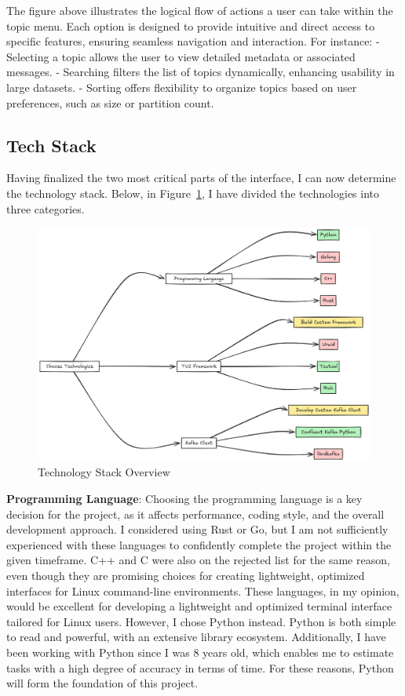 \documentclass[10pt , a4paper]{report}
\begin{document}
The figure above illustrates the logical flow of actions a user can take within the topic menu. Each option is designed to provide intuitive and direct access to specific features, ensuring seamless navigation and interaction. For instance:
- Selecting a topic allows the user to view detailed metadata or associated messages.
- Searching filters the list of topics dynamically, enhancing usability in large datasets.
- Sorting offers flexibility to organize topics based on user preferences, such as size or partition count.


\newpage
\subsection{Tech Stack}

Having finalized the two most critical parts of the interface, I can now determine the technology stack. Below, in Figure~\ref{fig:tech_chart}, I have divided the technologies into three categories.

\begin{figure}[htbp]
    \centering
    \includegraphics[width=.8\linewidth]{imgs/TechDiagram.png}
    \caption{Technology Stack Overview}
    \label{fig:tech_chart}
\end{figure}

\textbf{Programming Language}: Choosing the programming language is a key decision for the project, as it affects performance, coding style, and the overall development approach. I considered using Rust or Go, but I am not sufficiently experienced with these languages to confidently complete the project within the given timeframe. C++ and C were also on the rejected list for the same reason, even though they are promising choices for creating lightweight, optimized interfaces for Linux command-line environments. These languages, in my opinion, would be excellent for developing a lightweight and optimized terminal interface tailored for Linux users. However, I chose Python instead. Python is both simple to read and powerful, with an extensive library ecosystem. Additionally, I have been working with Python since I was 8 years old, which enables me to estimate tasks with a high degree of accuracy in terms of time. For these reasons, Python will form the foundation of this project.
\end{document}
